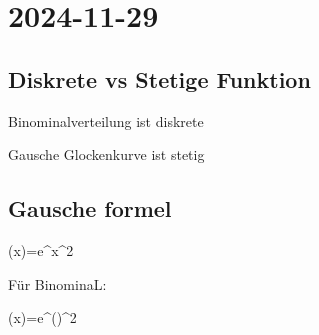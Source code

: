 \section{2024-11-29}

\subsection{Diskrete vs Stetige Funktion}

Binominalverteilung ist diskrete

Gausche Glockenkurve ist stetig

\subsection{Gausche formel}

\startformula

\phi (x)=e^{x^2}

\stopformula


Für BinominaL:

\startformula

\phi (x)=e^{()^2}

\stopformula

